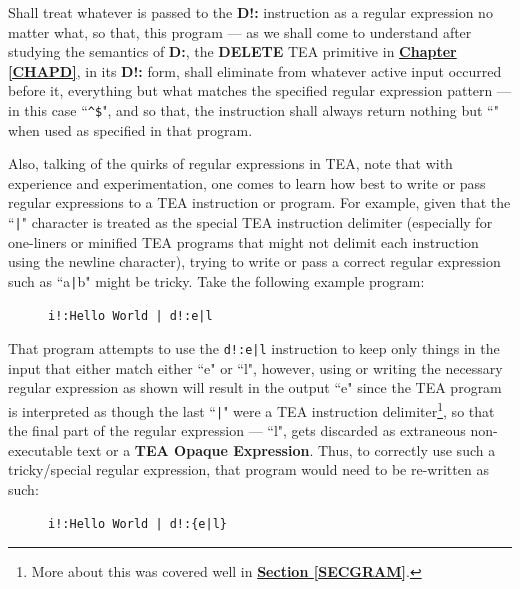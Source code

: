 \documentclass[a4paper, 18pt]{book} %
\begin{document}
Shall treat whatever is passed to the \textbf{D!:} instruction as a regular expression no matter what, so that, this program --- as we shall come to understand after studying the semantics of \textbf{D:}, the \textbf{DELETE} TEA primitive in \textbf{\hyperref[CHAPD]{Chapter \ref{CHAPD}}}, in its \textbf{D!:} form, shall eliminate from whatever active input occurred before it, everything but what matches the specified regular expression pattern --- in this case ``\verb|^$|", and so that, the instruction shall always return nothing but ``" when used as specified in that program.

Also, talking of the quirks of regular expressions in TEA, note that with experience and experimentation, one comes to learn how best to write or pass regular expressions to a TEA instruction or program. For example, given that the ``\verb$|$" character is treated as the special TEA instruction delimiter (especially for one-liners or minified TEA programs that might not delimit each instruction using the newline character), trying to write or pass a correct regular expression such as ``a\verb$|$b" might be tricky. Take the following example program:


\begin{figure}[H]
 \Large
  \centering
  \begin{tcolorbox}[teaterminalstyle, title=TEA Program Example 3]
  \begin{lstlisting}[language=TEA]
i!:Hello World | d!:e|l
   \end{lstlisting}
  \end{tcolorbox}
\end{figure}

That program attempts to use the \texttt{d!:e|l} instruction to keep only things in the input that either match either ``e" or ``l", however, using or writing the necessary regular expression as shown will result in the output ``e" since the TEA program is interpreted as though the last ``\verb#|#" were a TEA instruction delimiter\footnote{More about this was covered well in \textbf{\hyperref[SECGRAM]{Section \ref{SECGRAM}}}.}, so that the final part of the regular expression --- ``l", gets discarded as extraneous non-executable text or a \textbf{TEA Opaque Expression}. Thus, to correctly use such a tricky/special regular expression, that program would need to be re-written as such:



\begin{figure}[H]
 \Large
  \centering
  \begin{tcolorbox}[teaterminalstyle, title=TEA Program Example 3]
  \begin{lstlisting}[language=TEA]
i!:Hello World | d!:{e|l}
   \end{lstlisting}
  \end{tcolorbox}
\end{figure}
\end{document}
